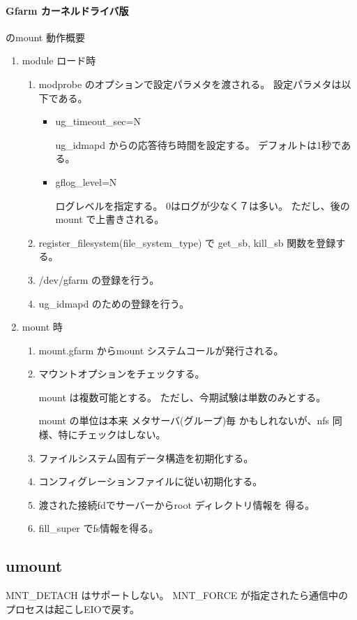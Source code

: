 \paragraph{Gfarm カーネルドライバ版} のmount 動作概要
	\begin{enumerate}
	\item	module ロード時	\par
		\begin{enumerate}
		\item	modprobe のオプションで設定パラメタを渡される。
			設定パラメタは以下である。
			\begin{itemize}
			\item ug_timeout_sec=N	\par
				ug_idmapd からの応答待ち時間を設定する。
				デフォルトは1秒である。
			\item gflog_level=N	\par
				ログレベルを指定する。
				0はログが少なく７は多い。
				ただし、後のmount で上書きされる。
			\end{itemize}
		\item	register_filesystem(file_system_type) で
			get_sb, kill_sb 関数を登録する。
		\item	/dev/gfarm の登録を行う。
		\item	ug_idmapd のための登録を行う。
		\end{enumerate}
	\item	mount 時
		\begin{enumerate}
		\item	mount.gfarm からmount システムコールが発行される。
		\item	マウントオプションをチェックする。	\par

			mount は複数可能とする。
			ただし、今期試験は単数のみとする。

			mount の単位は本来 メタサーバ(グループ)毎
			かもしれないが、nfs 同様、特にチェックはしない。

		\item	ファイルシステム固有データ構造を初期化する。
		\item	コンフィグレーションファイルに従い初期化する。
		\item	渡された接続fdでサーバーからroot ディレクトリ情報を
			得る。
		\item	fill_super でfs情報を得る。
		\end{enumerate}
	\end{enumerate}


\subsection{umount}
	MNT_DETACH はサポートしない。
	MNT_FORCE が指定されたら通信中のプロセスは起こしEIOで戻す。

